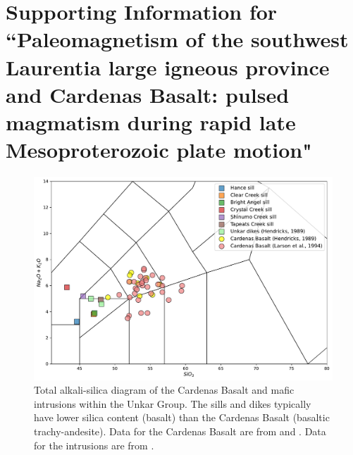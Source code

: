 \chapter[Supporting Information for ``Paleomagnetism of the southwest Laurentia large igneous province and Cardenas Basalt: pulsed magmatism during rapid late Mesoproterozoic plate motion"][Supporting Information--SWLLIP]{Supporting Information for ``Paleomagnetism of the southwest Laurentia large igneous province and Cardenas Basalt: pulsed magmatism during rapid late Mesoproterozoic plate motion"}

\begin{figure}
\centering
\includegraphics[width=\textwidth]{figure/Zhang2024b/Cardenas_Unkar_geochem_major.pdf}
\caption[Major element geochemical data of the Cardenas Basalt and diabase intrusions in the Unkar Group.]{Total alkali-silica diagram of the Cardenas Basalt and mafic intrusions within the Unkar Group. The sills and dikes typically have lower silica content (basalt) than the Cardenas Basalt (basaltic trachy-andesite). Data for the Cardenas Basalt are from \cite{Hendricks1989a} and \cite{Larson1994a}. Data for the intrusions are from \cite{Hendricks1989a}.}
\label{fig:geochem_major}
\end{figure}

